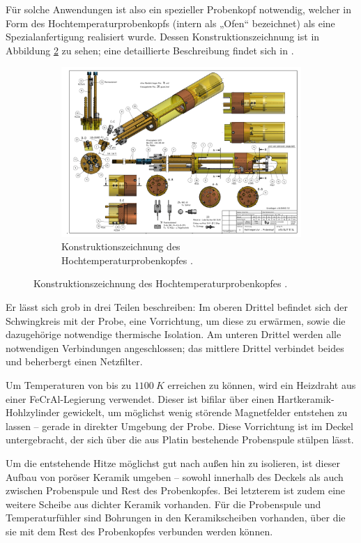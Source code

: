Für solche Anwendungen ist also ein spezieller Probenkopf notwendig, welcher in Form des Hochtemperaturprobenkopfs (intern als „Ofen“ bezeichnet) als eine Spezialanfertigung realisiert wurde. Dessen Konstruktionszeichnung ist in Abbildung \ref{fig:exp:ofen_aufbau} zu sehen; eine detaillierte Beschreibung findet sich in \cite{tilly_master}.

\begin{figure}
	\begin{figure}[H]
		\includegraphics[width=1.05\textheight]{graphics/ofen/ofen_aufbau2.pdf}
		\caption{Konstruktionszeichnung des Hochtemperaturprobenkopfes \cite{Rudloff_blue_print}.}
		\label{fig:exp:ofen_aufbau}
	\end{figure}
\end{figure}

Er lässt sich grob in drei Teilen beschreiben: Im oberen Drittel befindet sich der Schwingkreis mit der Probe, eine Vorrichtung, um diese zu erwärmen, sowie die dazugehörige notwendige thermische Isolation. Am unteren Drittel werden alle notwendigen Verbindungen angeschlossen; das mittlere Drittel verbindet beides und beherbergt einen Netzfilter.

Um Temperaturen von bis zu $\SI{1100}{K}$ erreichen zu können, wird ein Heizdraht aus einer FeCrAl-Legierung verwendet. Dieser ist bifilar über einen Hartkeramik-Hohlzylinder gewickelt, um möglichst wenig störende Magnetfelder entstehen zu lassen -- gerade in direkter Umgebung der Probe. Diese Vorrichtung ist im Deckel untergebracht, der sich über die aus Platin bestehende Probenspule stülpen lässt.

Um die entstehende Hitze möglichst gut nach außen hin zu isolieren, ist dieser Aufbau von poröser Keramik umgeben -- sowohl innerhalb des Deckels als auch zwischen Probenspule und Rest des Probenkopfes. Bei letzterem ist zudem eine weitere Scheibe aus dichter Keramik vorhanden. Für die Probenspule und Temperaturfühler sind Bohrungen in den Keramikscheiben vorhanden, über die sie mit dem Rest des Probenkopfes verbunden werden können.

